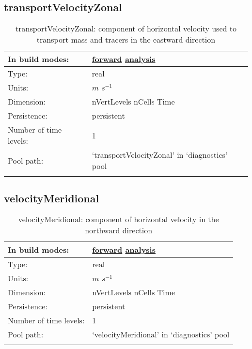\subsection[transportVelocityZonal]{transportVelocityZonal}
\label{subsec:var_sec_diagnostics_transportVelocityZonal}
\begin{center}
\begin{longtable}{| p{2.0in} | p{4.0in} |}
        \hline 
        In build modes: & \hyperref[subsec:forward_var_tab_diagnostics]{forward} \hyperref[subsec:analysis_var_tab_diagnostics]{analysis} \\
        \hline 
        Type: & real \\
        \hline 
        Units: & $m$ $s^{-1}$ \\
        \hline 
        Dimension: & nVertLevels nCells Time \\
        \hline 
        Persistence: & persistent \\
        \hline 
        Number of time levels: & 1 \\
        \hline 
            Pool path: & `transportVelocityZonal' in `diagnostics' pool \\
		 \hline 
    \caption{transportVelocityZonal: component of horizontal velocity used to transport mass and tracers in the eastward direction}
\end{longtable}
\end{center}
\subsection[velocityMeridional]{velocityMeridional}
\label{subsec:var_sec_diagnostics_velocityMeridional}
\begin{center}
\begin{longtable}{| p{2.0in} | p{4.0in} |}
        \hline 
        In build modes: & \hyperref[subsec:forward_var_tab_diagnostics]{forward} \hyperref[subsec:analysis_var_tab_diagnostics]{analysis} \\
        \hline 
        Type: & real \\
        \hline 
        Units: & $m$ $s^{-1}$ \\
        \hline 
        Dimension: & nVertLevels nCells Time \\
        \hline 
        Persistence: & persistent \\
        \hline 
        Number of time levels: & 1 \\
        \hline 
            Pool path: & `velocityMeridional' in `diagnostics' pool \\
		 \hline 
    \caption{velocityMeridional: component of horizontal velocity in the northward direction}
\end{longtable}
\end{center}
